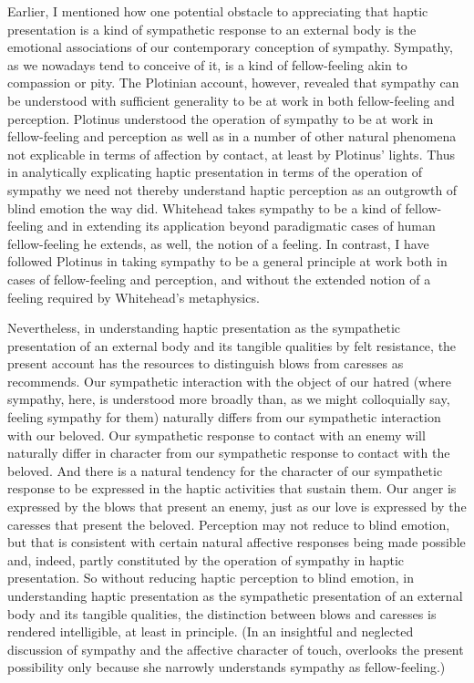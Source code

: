 Earlier, I mentioned how one potential obstacle to appreciating that haptic presentation is a kind of sympathetic response to an external body is the emotional associations of our contemporary conception of sympathy. Sympathy, as we nowadays tend to conceive of it, is a kind of fellow-feeling akin to compassion or pity. The Plotinian account, however, revealed that sympathy can be understood with sufficient generality to be at work in both fellow-feeling and perception. Plotinus understood the operation of sympathy to be at work in fellow-feeling and perception as well as in a number of other natural phenomena not explicable in terms of affection by contact, at least by Plotinus' lights. Thus in analytically explicating haptic presentation in terms of the operation of sympathy we need not thereby understand haptic perception as an outgrowth of blind emotion the way \citet[162--3]{Whitehead:1978zr} did. Whitehead takes sympathy to be a kind of fellow-feeling and in extending its application beyond paradigmatic cases of human fellow-feeling he extends, as well, the notion of a feeling. In contrast, I have followed Plotinus in taking sympathy to be a general principle at work both in cases of fellow-feeling and perception, and without the extended notion of a feeling required by Whitehead's metaphysics.


Nevertheless, in understanding haptic presentation as the sympathetic presentation of an external body and its tangible qualities by felt resistance, the present account has the resources to distinguish blows from caresses as \citet{Derrida:2005aa} recommends. Our sympathetic interaction with the object of our hatred (where sympathy, here, is understood more broadly than, as we might colloquially say, feeling sympathy for them) naturally differs from our sympathetic interaction with our beloved. Our sympathetic response to contact with an enemy will naturally differ in character from our sympathetic response to contact with the beloved. And there is a natural tendency for the character of our sympathetic response to be expressed in the haptic activities that sustain them. Our anger is expressed by the blows that present an enemy, just as our love is expressed by the caresses that present the beloved. Perception may not reduce to blind emotion, but that is consistent with certain natural affective responses being made possible and, indeed, partly constituted by the operation of sympathy in haptic presentation. So without reducing haptic perception to blind emotion, in understanding haptic presentation as the sympathetic presentation of an external body and its tangible qualities, the distinction between blows and caresses is rendered intelligible, at least in principle. (In an insightful and neglected discussion of sympathy and the affective character of touch, \citealt{Wyschogrod:1981qp} overlooks the present possibility only because she narrowly understands sympathy as fellow-feeling.)


